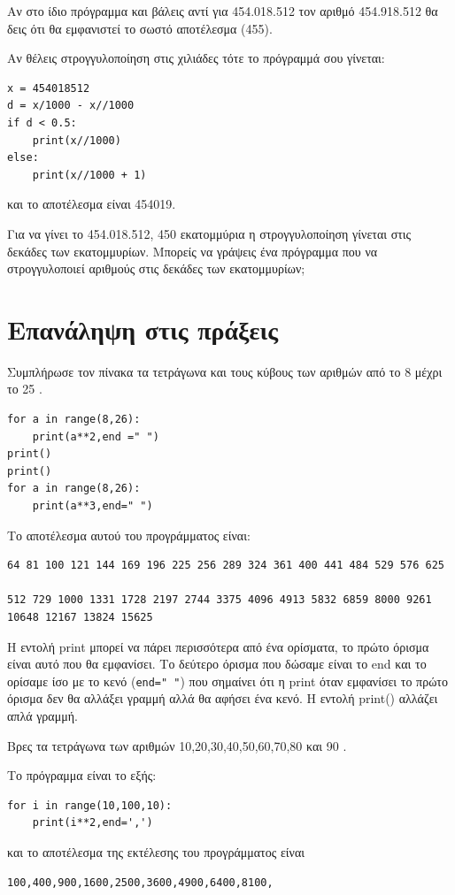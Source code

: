 Αν στο ίδιο πρόγραμμα και βάλεις αντί για 454.018.512 τον αριθμό 454.918.512 θα δεις ότι θα εμφανιστεί το σωστό αποτέλεσμα (455).

Αν θέλεις στρογγυλοποίηση στις χιλιάδες τότε το πρόγραμμά σου γίνεται:
\begin{lstlisting}
x = 454018512
d = x/1000 - x//1000
if d < 0.5:
    print(x//1000)
else:
    print(x//1000 + 1)
\end{lstlisting}
και το αποτέλεσμα είναι 454019.

\begin{exercise}
Για να γίνει το 454.018.512, 450 εκατομμύρια  η στρογγυλοποίηση γίνεται στις δεκάδες των εκατομμυρίων. Μπορείς να γράψεις ένα πρόγραμμα που να στρογγυλοποιεί αριθμούς στις δεκάδες των εκατομμυρίων;
\end{exercise}

\section{Επανάληψη στις πράξεις}
\begin{exercise}
Συμπλήρωσε τον πίνακα τα τετράγωνα και τους κύβους των αριθμών από το 8 μέχρι το 25 .
\end{exercise}
\begin{lstlisting}
for a in range(8,26):
    print(a**2,end =" ")
print()
print()
for a in range(8,26):
    print(a**3,end=" ")
\end{lstlisting}
Το αποτέλεσμα αυτού του προγράμματος είναι:

\begin{lstlisting}
64 81 100 121 144 169 196 225 256 289 324 361 400 441 484 529 576 625 

512 729 1000 1331 1728 2197 2744 3375 4096 4913 5832 6859 8000 9261 
10648 12167 13824 15625
\end{lstlisting}

Η εντολή print μπορεί να πάρει περισσότερα από ένα ορίσματα, το πρώτο όρισμα είναι αυτό που θα εμφανίσει. Το δεύτερο όρισμα που δώσαμε είναι το end και το ορίσαμε ίσο με το κενό (\lstinline{end=" "}) που σημαίνει ότι η print όταν εμφανίσει το πρώτο όρισμα δεν θα αλλάξει γραμμή αλλά θα αφήσει ένα κενό. Η εντολή print() αλλάζει απλά γραμμή.
\begin{exercise}
Βρες τα τετράγωνα των αριθμών 10,20,30,40,50,60,70,80 και 90 .
\end{exercise}
Το πρόγραμμα είναι το εξής:
\begin{lstlisting}
for i in range(10,100,10):
    print(i**2,end=',')
\end{lstlisting}
και το αποτέλεσμα της εκτέλεσης του προγράμματος είναι
\begin{lstlisting}
100,400,900,1600,2500,3600,4900,6400,8100,
\end{lstlisting}

